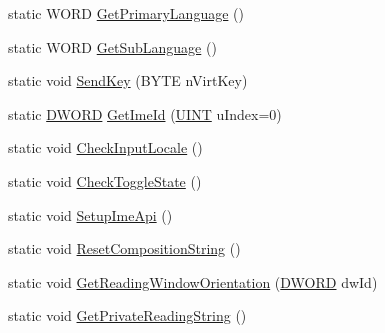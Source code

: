 \begin{DoxyCompactItemize}
\item 
static WORD \hyperlink{class_c_d_x_u_t_i_m_e_edit_box_a4edd66c64b9c6df7f2a2e2e58992fab0}{GetPrimaryLanguage} ()
\item 
static WORD \hyperlink{class_c_d_x_u_t_i_m_e_edit_box_ad919907a4c55dad632a9195b49c63765}{GetSubLanguage} ()
\item 
static void \hyperlink{class_c_d_x_u_t_i_m_e_edit_box_a41a841ff166e8221dd4a82c58661790f}{SendKey} (BYTE nVirtKey)
\item 
static \hyperlink{class_c_d_x_u_t_i_m_e_edit_box_a4666fce9b285d692ceb0515bf2dbde90}{DWORD} \hyperlink{class_c_d_x_u_t_i_m_e_edit_box_a4b734d1075be1611fbbd0455ccfedc8f}{GetImeId} (\hyperlink{class_c_d_x_u_t_i_m_e_edit_box_a7c83b549328a07897bdac88bb0ac4d68}{UINT} uIndex=0)
\item 
static void \hyperlink{class_c_d_x_u_t_i_m_e_edit_box_a77eef5eb2d0b144a985692d8a4cd5d3c}{CheckInputLocale} ()
\item 
static void \hyperlink{class_c_d_x_u_t_i_m_e_edit_box_a6b51f5a9a9170a89b0430224b0d56757}{CheckToggleState} ()
\item 
static void \hyperlink{class_c_d_x_u_t_i_m_e_edit_box_a0f59d99fd3cef32c0a0a1b4c3b5bcfd8}{SetupImeApi} ()
\item 
static void \hyperlink{class_c_d_x_u_t_i_m_e_edit_box_aaf6fd90a9cd492f6194bb0a8053fbcc3}{ResetCompositionString} ()
\item 
static void \hyperlink{class_c_d_x_u_t_i_m_e_edit_box_ac6593b484984dd398fa7311b010380ca}{GetReadingWindowOrientation} (\hyperlink{class_c_d_x_u_t_i_m_e_edit_box_a4666fce9b285d692ceb0515bf2dbde90}{DWORD} dwId)
\item 
static void \hyperlink{class_c_d_x_u_t_i_m_e_edit_box_aef1648e42d87d0f46691c427759cf71d}{GetPrivateReadingString} ()
\end{DoxyCompactItemize}
